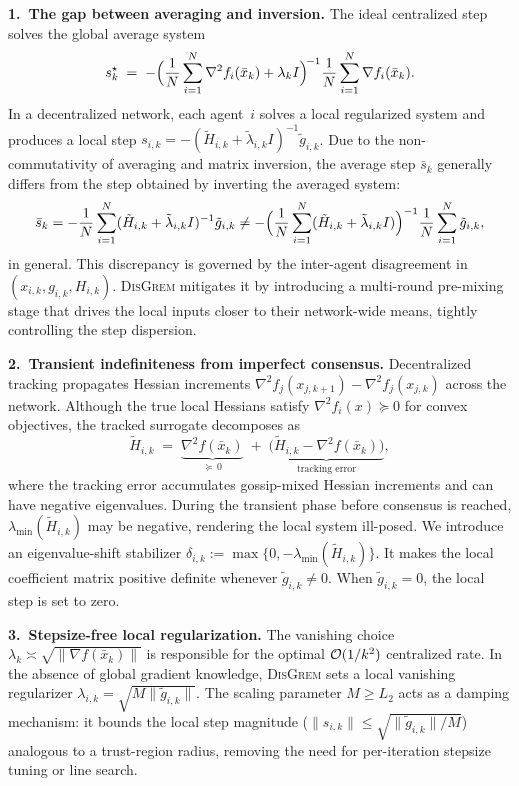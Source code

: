 \documentclass[review,onefignum,onetabnum]{siamart171218}
\begin{document}
	\noindent\textbf{1.\ The gap between averaging and inversion.}
	The ideal centralized step solves the global average system
	\[
	s_k^{\star}
	\;=\;
	-\Bigl(\frac{1}{N}\sum_{i=1}^{N}\nabla^2 f_i(\bar x_k)
	+\lambda_k I\Bigr)^{\!-1}
	\frac{1}{N}\sum_{i=1}^{N}\nabla f_i(\bar x_k).
	\]
	In a decentralized network, each agent~$i$ solves a local regularized
	system and produces a local step
	$s_{i,k}=-(\tilde H_{i,k}+\tilde\lambda_{i,k}I)^{-1}\tilde g_{i,k}$.
	Due to the non-commutativity of averaging and matrix inversion,
	the average step $\bar s_k$ generally differs from the step obtained
	by inverting the averaged system:
	\[
	\bar s_k
	=
	-\frac{1}{N}\sum_{i=1}^{N}
	(\tilde H_{i,k}+\tilde\lambda_{i,k}I)^{-1}\tilde g_{i,k}
	\neq
	-\Bigl(\frac{1}{N}\sum_{i=1}^{N}
	(\tilde H_{i,k}+\tilde\lambda_{i,k}I)\Bigr)^{-1}
	\frac{1}{N}\sum_{i=1}^{N}\tilde g_{i,k},
	\]
	in general.
	This discrepancy is governed by the inter-agent disagreement in
	$(x_{i,k},g_{i,k},H_{i,k})$.
	\textsc{DisGrem} mitigates it by introducing a multi-round
	pre-mixing stage that drives the local inputs closer to their
	network-wide means, tightly controlling the step dispersion.
	
	\noindent\textbf{2.\ Transient indefiniteness from imperfect consensus.}
	Decentralized tracking propagates Hessian increments
	$\nabla^2 f_j(x_{j,k+1})-\nabla^2 f_j(x_{j,k})$ across
	the network.
	Although the true local Hessians satisfy $\nabla^2 f_i(x)\succeq 0$
	for convex objectives, the tracked surrogate decomposes as
	\[
	\tilde H_{i,k}
	\;=\;
	\underbrace{\nabla^2 f(\bar x_k)}_{\succeq\,0}
	\;+\;
	\underbrace{\bigl(\tilde H_{i,k}-\nabla^2 f(\bar x_k)\bigr)}_{\text{tracking error}},
	\]
	where the tracking error accumulates gossip-mixed Hessian increments
	and can have negative eigenvalues.
	During the transient phase before consensus is reached,
	$\lambda_{\min}(\tilde H_{i,k})$ may be negative, rendering
	the local system ill-posed.
	We introduce an eigenvalue-shift stabilizer
	$\delta_{i,k}:=\max\{0,-\lambda_{\min}(\tilde H_{i,k})\}$.
	It makes the local coefficient matrix positive definite whenever
	$\tilde g_{i,k}\ne0$. When $\tilde g_{i,k}=0$, the local step is
	set to zero.
	
	\noindent\textbf{3.\ Stepsize-free local regularization.}
	The vanishing choice
	$\lambda_k\asymp\sqrt{\|\nabla f(\bar x_k)\|}$ is responsible
	for the optimal $\mathcal{O}(1/k^2)$ centralized rate.
	In the absence of global gradient knowledge, \textsc{DisGrem}
	sets a local vanishing regularizer
	$\lambda_{i,k}=\sqrt{M\|\tilde g_{i,k}\|}$.
	The scaling parameter $M\ge L_2$ acts as a damping
	mechanism: it bounds the local step magnitude
	($\|s_{i,k}\|\le\sqrt{\|\tilde g_{i,k}\|/M}$) analogous to a
	trust-region radius, removing the need for
	per-iteration stepsize tuning or line search.
	
\end{document}
